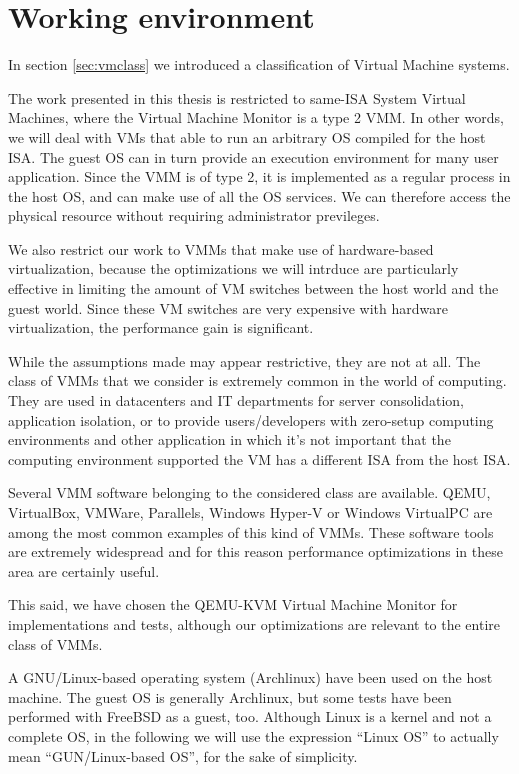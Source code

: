 \chapter{Working environment}
In section \ref{sec:vmclass} we introduced a classification of Virtual Machine systems.

The work presented in this thesis is restricted to same-ISA System Virtual Machines, where the Virtual Machine Monitor is a type 2 VMM.
In other words, we will deal with VMs that able to run an arbitrary OS compiled for the host ISA. The guest OS can in turn provide an 
execution environment for many user application.
Since the VMM is of type 2, it is implemented as a regular process in the host OS, and can make use of all the OS services.
We can therefore access the physical resource without requiring administrator previleges.

We also restrict our work to VMMs that make use of hardware-based virtualization, because the optimizations we will intrduce are
particularly effective in limiting the amount of VM switches between the host world and the guest world. Since these VM switches
are very expensive with hardware virtualization, the performance gain is significant.

While the assumptions made may appear restrictive, they are not at all. The class of VMMs that we consider is extremely 
common in the world of computing. They are used in datacenters and IT departments for server consolidation, 
application isolation, or to provide users/developers with zero-setup computing environments and other application in which it's
not important that the computing environment supported the VM has a different ISA from the host ISA.

\vspace{0.5cm}

Several VMM software belonging to the considered class are available. QEMU, VirtualBox, VMWare, Parallels, Windows
Hyper-V or Windows VirtualPC are among the most common examples of this kind of VMMs. These software tools are extremely widespread
and for this reason performance optimizations in these area are certainly useful.

This said, we have chosen the QEMU-KVM Virtual Machine Monitor for implementations and tests, although our optimizations are
relevant to the entire class of VMMs.

A GNU/Linux-based operating system (Archlinux) have been used on the host machine. The guest OS is generally Archlinux, but 
some tests have been performed with FreeBSD as a guest, too. Although Linux is a kernel and not a complete OS, in the following we 
will use  the expression ``Linux OS'' to actually mean ``GUN/Linux-based OS'', for the sake of simplicity.

